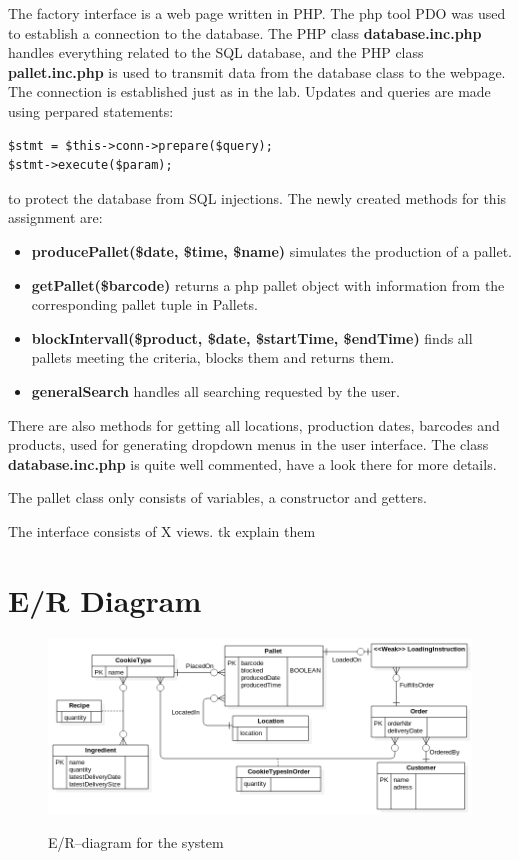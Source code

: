 \documentclass[a4paper]{scrartcl}
\numberwithin{equation}{section}
\begin{document}
The factory interface is a web page written in PHP. 
The php tool PDO was used to establish a connection to the database. 
The PHP class \textbf{database.inc.php} handles everything related to the SQL database, and the PHP class \textbf{pallet.inc.php} is used to transmit data from the database class to the webpage.
The connection is established just as in the lab.
Updates and queries are made using perpared statements:
\begin{verbatim}
$stmt = $this->conn->prepare($query);
$stmt->execute($param);
\end{verbatim}
to protect the database from SQL injections. 
The newly created methods for this assignment are:
\begin{itemize}
  \item \textbf{producePallet(\$date, \$time, \$name)} simulates the production of a pallet.
  \item \textbf{getPallet(\$barcode)} returns a php pallet object with information from the corresponding pallet tuple in Pallets.
  \item \textbf{blockIntervall(\$product, \$date, \$startTime, \$endTime)} finds all pallets meeting the criteria, blocks them and returns them.
  \item \textbf{generalSearch} handles all searching requested by the user.
\end{itemize}
There are also methods for getting all locations, production dates, barcodes and products, used for generating dropdown menus in the user interface. 
The class \textbf{database.inc.php} is quite well commented, have a look there for more details.

The pallet class only consists of variables, a constructor and getters.



The interface consists of X views. tk explain them
\section*{E/R Diagram}

\begin{figure}[h!]
  \begin{centering}
    \includegraphics[width=\textwidth]{../ER.png}
    \label{er-diagram}
    \caption{E/R--diagram for the system}
  \end{centering}
\end{figure}
\end{document}
